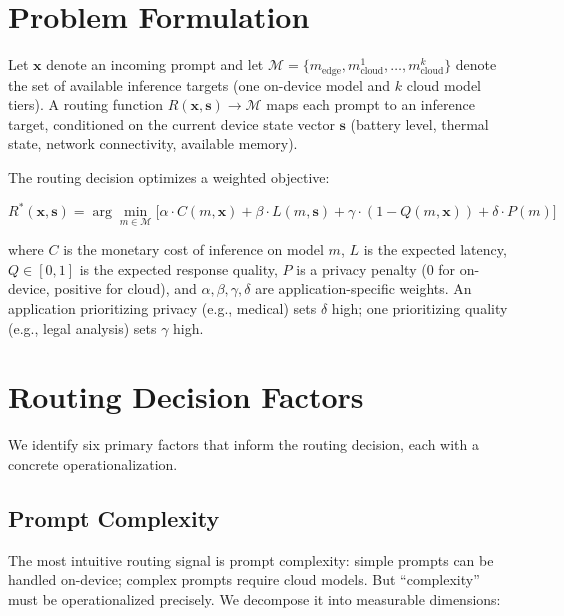 \documentclass[12pt, letterpaper, twoside]{report}
\begin{document}
\section{Problem Formulation}
\label{sec:routing_formulation}

Let $\mathbf{x}$ denote an incoming prompt and let $\mathcal{M} = \{m_{\text{edge}}, m_{\text{cloud}}^1, \ldots, m_{\text{cloud}}^k\}$ denote the set of available inference targets (one on-device model and $k$ cloud model tiers). A routing function $R(\mathbf{x}, \mathbf{s}) \to \mathcal{M}$ maps each prompt to an inference target, conditioned on the current device state vector $\mathbf{s}$ (battery level, thermal state, network connectivity, available memory).

The routing decision optimizes a weighted objective:

\begin{equation}
R^*(\mathbf{x}, \mathbf{s}) = \arg\min_{m \in \mathcal{M}} \Big[ \alpha \cdot C(m, \mathbf{x}) + \beta \cdot L(m, \mathbf{s}) + \gamma \cdot (1 - Q(m, \mathbf{x})) + \delta \cdot P(m) \Big]
\label{eq:routing_objective}
\end{equation}

where $C$ is the monetary cost of inference on model $m$, $L$ is the expected latency, $Q \in [0,1]$ is the expected response quality, $P$ is a privacy penalty (0 for on-device, positive for cloud), and $\alpha, \beta, \gamma, \delta$ are application-specific weights. An application prioritizing privacy (e.g., medical) sets $\delta$ high; one prioritizing quality (e.g., legal analysis) sets $\gamma$ high.

\section{Routing Decision Factors}
\label{sec:routing_factors}

We identify six primary factors that inform the routing decision, each with a concrete operationalization.

\subsection{Prompt Complexity}
\label{subsec:complexity}

The most intuitive routing signal is prompt complexity: simple prompts can be handled on-device; complex prompts require cloud models. But ``complexity'' must be operationalized precisely. We decompose it into measurable dimensions:
\end{document}
